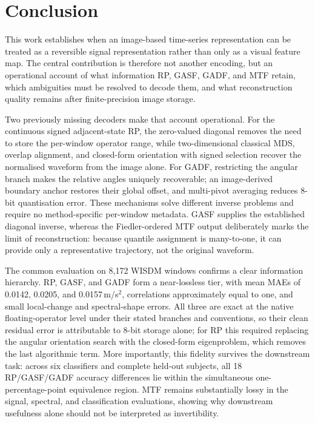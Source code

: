\documentclass[5p]{elsarticle}
\begin{document}
\section{Conclusion}\label{sec:conclusion}

This work establishes when an image-based time-series representation can be treated as a reversible signal representation rather than only as a visual feature map. The central contribution is therefore not another encoding, but an operational account of what information RP, GASF, GADF, and MTF retain, which ambiguities must be resolved to decode them, and what reconstruction quality remains after finite-precision image storage.

Two previously missing decoders make that account operational. For the continuous signed adjacent-state RP, the zero-valued diagonal removes the need to store the per-window operator range, while two-dimensional classical MDS, overlap alignment, and closed-form orientation with signed selection recover the normalised waveform from the image alone. For GADF, restricting the angular branch makes the relative angles uniquely recoverable; an image-derived boundary anchor restores their global offset, and multi-pivot averaging reduces 8-bit quantisation error. These mechanisms solve different inverse problems and require no method-specific per-window metadata. GASF supplies the established diagonal inverse, whereas the Fiedler-ordered MTF output deliberately marks the limit of reconstruction: because quantile assignment is many-to-one, it can provide only a representative trajectory, not the original waveform.

The common evaluation on 8,172 WISDM windows confirms a clear information hierarchy. RP, GASF, and GADF form a near-lossless tier, with mean MAEs of 0.0142, 0.0205, and 0.0157\,m/s$^2$, correlations approximately equal to one, and small local-change and spectral-shape errors. All three are exact at the native floating-operator level under their stated branches and conventions, so their clean residual error is attributable to 8-bit storage alone; for RP this required replacing the angular orientation search with the closed-form eigenproblem, which removes the last algorithmic term. More importantly, this fidelity survives the downstream task: across six classifiers and complete held-out subjects, all 18 RP/GASF/GADF accuracy differences lie within the simultaneous one-percentage-point equivalence region. MTF remains substantially lossy in the signal, spectral, and classification evaluations, showing why downstream usefulness alone should not be interpreted as invertibility.
\end{document}
